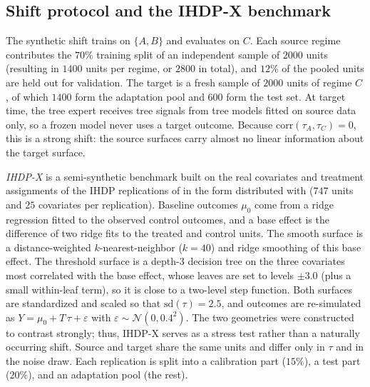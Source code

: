 \documentclass[pdflatex,sn-mathphys-num]{sn-jnl}
\begin{document}
\subsection{Shift protocol and the IHDP-X benchmark}
The synthetic shift trains on $\{A,B\}$ and evaluates on $C$. Each source regime contributes the $70\%$ training split of an independent sample of $2000$ units (resulting in $1400$ units per regime, or $2800$ in total), and $12\%$ of the pooled units are held out for validation. The target is a fresh sample of $2000$ units of regime $C$, of which $1400$ form the adaptation pool and $600$ form the test set. At target time, the tree expert receives tree signals from tree models fitted on source data only, so a frozen model never uses a target outcome. Because $\mathrm{corr}(\tau_A,\tau_C)=0$, this is a strong shift: the source surfaces carry almost no linear information about the target surface.

\emph{IHDP-X} is a semi-synthetic benchmark built on the real covariates and treatment assignments of the IHDP replications of \citet{hill2011} in the form distributed with \citet{shalit2017} ($747$ units and $25$ covariates per replication). Baseline outcomes $\mu_0$ come from a ridge regression fitted to the observed control outcomes, and a base effect is the difference of two ridge fits to the treated and control units. The smooth surface is a distance-weighted $k$-nearest-neighbor ($k=40$) and ridge smoothing of this base effect. The threshold surface is a depth-3 decision tree on the three covariates most correlated with the base effect, whose leaves are set to levels $\pm3.0$ (plus a small within-leaf term), so it is close to a two-level step function. Both surfaces are standardized and scaled so that $\mathrm{sd}(\tau)=2.5$, and outcomes are re-simulated as $Y=\mu_0+T\,\tau+\varepsilon$ with $\varepsilon\sim\mathcal N(0,0.4^2)$. The two geometries were constructed to contrast strongly; thus, IHDP-X serves as a stress test rather than a naturally occurring shift. \newpage Source and target share the same units and differ only in $\tau$ and in the noise draw. Each replication is split into a calibration part ($15\%$), a test part ($20\%$), and an adaptation pool (the rest).
\end{document}
